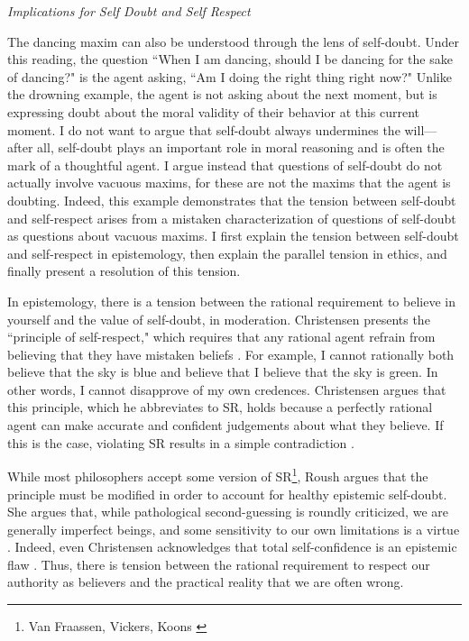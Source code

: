 \begin{isabellebody}
\begin{isamarkuptext}
\emph{Implications for Self Doubt and Self Respect}

The dancing maxim can also be understood through the lens of self-doubt. Under this 
reading, the question ``When I am dancing, 
should I be dancing for the sake of dancing?" is the agent asking, ``Am I doing the right thing 
right now?" Unlike the drowning example, the agent is not asking about the next moment, but is expressing doubt about the 
moral validity of their behavior at this current moment. I do not want to argue that self-doubt always
 undermines the will—after all, self-doubt plays an important role in moral 
reasoning and is often the mark of a thoughtful agent. I argue instead that questions of self-doubt
do not actually involve vacuous maxims, for these are not the maxims that the agent is doubting. Indeed,
this example demonstrates that the tension between self-doubt and self-respect arises from a 
mistaken characterization of questions of self-doubt as questions about vacuous maxims.
I first explain the tension between self-doubt and self-respect in epistemology, then 
explain the parallel tension in ethics, and finally present a resolution of this tension.

In epistemology, there is a tension between the rational requirement to believe in yourself and the 
value of self-doubt, in moderation. Christensen presents the ``principle of self-respect," which requires 
that any rational agent refrain from believing that they have mistaken beliefs \cite[4]{christensen}. For example, I cannot 
rationally both believe that the sky is blue and believe that I believe that the sky is green. In other words, I cannot 
disapprove of my own credences. Christensen argues that this principle, which he abbreviates to SR, holds because 
a perfectly rational agent can make accurate and confident judgements about what they believe. If this 
is the case, violating SR results in a simple contradiction \cite[8-9]{christensen}. 

While most philosophers accept some version of SR\footnote{Van Fraassen, Vickers, Koons \cite[5]{christensen}}, 
Roush argues that the principle must be modified in order to account for healthy epistemic 
self-doubt. She argues that, while pathological second-guessing is roundly criticized, we are generally 
imperfect beings, and some sensitivity to our own limitations is a virtue \cite[2]{roushselfhelp}. Indeed, even Christensen 
acknowledges that total self-confidence is an epistemic flaw \cite[1]{christensen}. Thus, there is tension between the rational
requirement to respect our authority as believers and the practical reality that we are often wrong. 


\end{isamarkuptext}
\end{isabellebody}
